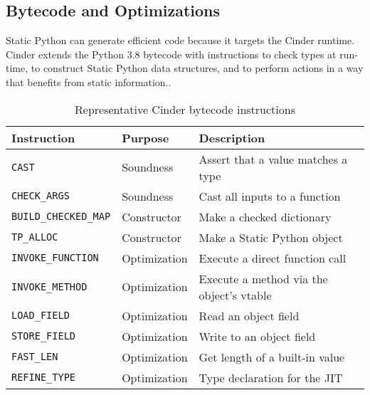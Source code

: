 \documentclass[english,cleveref,submission]{programming}
\newcommand{\SP}{Static Python}
\newcommand{\code}[1]{\texttt{#1}}
\newcommand{\bcinst}[1]{\code{#1}}
\begin{document}
\subsection{Bytecode and Optimizations}
\label{s:optimize}

\SP{} can generate efficient code because it targets
the Cinder runtime.
Cinder extends the Python 3.8 bytecode with instructions to check types at run-time,
to construct \SP{} data structures, and to perform actions in a way that benefits from
static information..

\begin{table}
  \caption{Representative Cinder bytecode instructions}
  \label{t:bytecode}

  \begin{tabular}{lll}
    {Instruction} & {Purpose} & {Description} \\\hline
    \bcinst{CAST} & Soundness & Assert that a value matches a type \\
    \bcinst{CHECK\_ARGS} & Soundness & Cast all inputs to a function \\[1ex]

    \bcinst{BUILD\_CHECKED\_MAP} & Constructor & Make a checked dictionary \\
    \bcinst{TP\_ALLOC} & Constructor & Make a \SP{} object \\[1ex]

    \bcinst{INVOKE\_FUNCTION} & Optimization & Execute a direct function call \\
    \bcinst{INVOKE\_METHOD} & Optimization & Execute a method via the object's vtable \\
    \bcinst{LOAD\_FIELD} & Optimization & Read an object field \\
    \bcinst{STORE\_FIELD} & Optimization & Write to an object field \\
    \bcinst{FAST\_LEN} & Optimization & Get length of a built-in value \\
    \bcinst{REFINE\_TYPE} & Optimization & Type declaration for the JIT \\


  \end{tabular}
\end{table}
\end{document}
